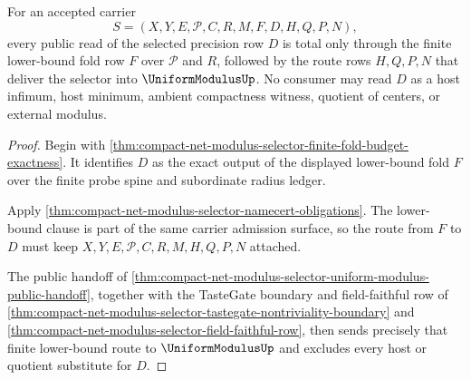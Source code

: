\begin{theorem}
\label{thm:compact-net-modulus-selector-lower-bound-route-totality}
For an accepted carrier
$$
S=(X,Y,E,\mathcal{P},C,R,M,F,D,H,Q,P,N),
$$
every public read of the selected precision row $D$ is total only through the finite lower-bound fold row $F$ over $\mathcal{P}$ and $R$, followed by the route rows $H,Q,P,N$ that deliver the selector into $\UniformModulusUp$. No consumer may read $D$ as a host infimum, host minimum, ambient compactness witness, quotient of centers, or external modulus.
\end{theorem}
\begin{proof}
Begin with \autoref{thm:compact-net-modulus-selector-finite-fold-budget-exactness}. It identifies $D$ as the exact output of the displayed lower-bound fold $F$ over the finite probe spine and subordinate radius ledger.

Apply \autoref{thm:compact-net-modulus-selector-namecert-obligations}. The lower-bound clause is part of the same carrier admission surface, so the route from $F$ to $D$ must keep $X,Y,E,\mathcal{P},C,R,M,H,Q,P,N$ attached.

The public handoff of \autoref{thm:compact-net-modulus-selector-uniform-modulus-public-handoff}, together with the TasteGate boundary and field-faithful row of \autoref{thm:compact-net-modulus-selector-tastegate-nontriviality-boundary} and \autoref{thm:compact-net-modulus-selector-field-faithful-row}, then sends precisely that finite lower-bound route to $\UniformModulusUp$ and excludes every host or quotient substitute for $D$.
\end{proof}

